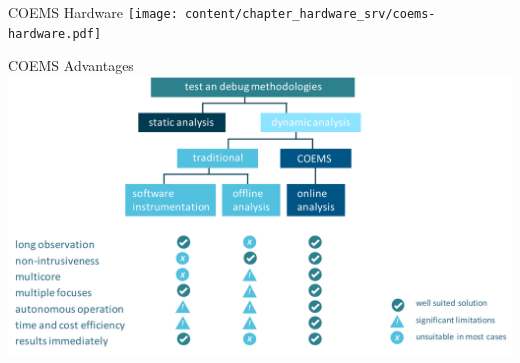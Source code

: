 \begin{frame}{COEMS Hardware}
  \texttt{[image: content/chapter\_hardware\_srv/coems-hardware.pdf]}
\end{frame}

\begin{frame}{COEMS Advantages}
  \includegraphics[width=\textwidth]{content/chapter_hardware_srv/coems-advantages.pdf}
\end{frame}